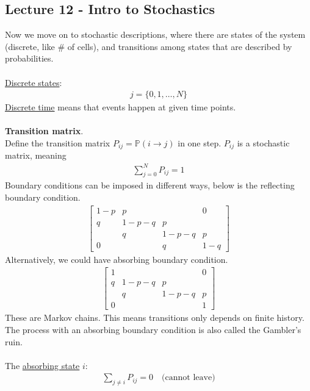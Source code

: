\documentclass[12pt, letterpaper]{article}
\begin{document}
\subsection{Lecture 12 - Intro to Stochastics}
Now we move on to stochastic descriptions, where there are states of the system (discrete, 
like \# of cells), and transitions among states that are described by probabilities. \\ \\
\underline{Discrete states}:
\begin{align*}
    j = \{0,1,\dots, N\}
\end{align*} 
\underline{Discrete time} means that events happen at given time points. \\ \\
\textbf{Transition matrix}. \\
Define the transition matrix $P_{ij} = \mathbb{P}(i\rightarrow j)$ in one step. $P_{ij}$ is a 
stochastic matrix, meaning
\begin{align*}
    \sum_{j=0}^{N} P_{ij} = 1
\end{align*}
Boundary conditions can be imposed in different ways, below is the reflecting boundary condition.
\begin{align*}
    \begin{bmatrix}
        1-p & p &  & 0\\
        q & 1- p - q & p & \\
         & q & 1-p-q & p \\
        0 &  & q & 1-q
    \end{bmatrix}
\end{align*}
Alternatively, we could have absorbing boundary condition.
\begin{align*}
    \begin{bmatrix}
        1 &  &  & 0\\
        q & 1- p - q & p & \\
         & q & 1-p-q & p \\
        0 &  &  & 1
    \end{bmatrix}
\end{align*}
These are Markov chains. This means transitions only depends on finite history. The process with
an absorbing boundary condition is also called the Gambler's ruin. \\ \\
The \underline{absorbing state} $i$:
\begin{align*}
    \sum_{j \ne i} P_{ij} = 0 \quad \text{(cannot leave)}
\end{align*}
\end{document}
